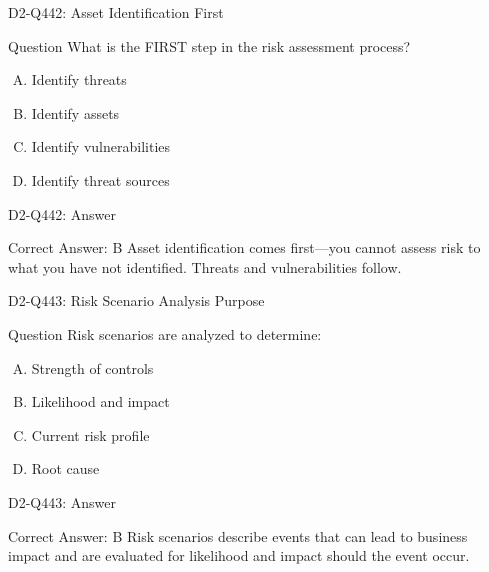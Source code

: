 \documentclass{beamer}
\begin{document}
\begin{frame}{D2-Q442: Asset Identification First}
	\begin{block}{Question}
		What is the FIRST step in the risk assessment process?
	\end{block}
	\begin{enumerate}[(A)]
		\item Identify threats
		\item Identify assets
		\item Identify vulnerabilities
		\item Identify threat sources
	\end{enumerate}
\end{frame}
\begin{frame}{D2-Q442: Answer}
	\begin{block}{Correct Answer: B}
		Asset identification comes first—you cannot assess risk to what you have not identified. Threats and vulnerabilities follow.
	\end{block}
\end{frame}

\begin{frame}{D2-Q443: Risk Scenario Analysis Purpose}
	\begin{block}{Question}
		Risk scenarios are analyzed to determine:
	\end{block}
	\begin{enumerate}[(A)]
		\item Strength of controls
		\item Likelihood and impact
		\item Current risk profile
		\item Root cause
	\end{enumerate}
\end{frame}
\begin{frame}{D2-Q443: Answer}
	\begin{block}{Correct Answer: B}
		Risk scenarios describe events that can lead to business impact and are evaluated for likelihood and impact should the event occur.
	\end{block}
\end{frame}
\end{document}
